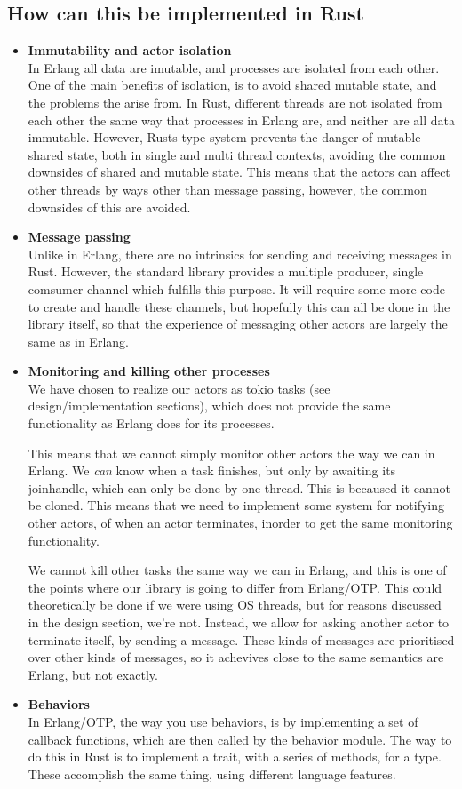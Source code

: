 \documentclass[a4paper]{article}
\begin{document}
\subsection{How can this be implemented in Rust}
\begin{itemize}
\item \textbf{Immutability and actor isolation}\\
  In Erlang all data are imutable, and processes are isolated from each other.
  One of the main benefits of isolation, is to avoid shared mutable state, and
  the problems the arise from. In Rust, different threads are not isolated from
  each other the same way that processes in Erlang are, and neither are all data
  immutable. However, Rusts type system prevents the danger of mutable shared
  state, both in single and multi thread contexts, avoiding the common downsides
  of shared and mutable state. This means that the actors can affect other
  threads by ways other than message passing, however, the common downsides of
  this are avoided.
\item \textbf{Message passing}\\
  Unlike in Erlang, there are no intrinsics for sending and receiving messages
  in Rust. However, the standard library provides a multiple producer, single
  comsumer channel which fulfills this purpose. It will require some more code
  to create and handle these channels, but hopefully this can all be done in the
  library itself, so that the experience of messaging other actors are largely
  the same as in Erlang.
\item \textbf{Monitoring and killing other processes}\\
  We have chosen to realize our actors as tokio tasks (see design/implementation
  sections), which does not provide the same functionality as Erlang does for
  its processes.

  This means that we cannot simply monitor other actors the way we can in
  Erlang. We \textit{can} know when a task finishes, but only by awaiting its
  joinhandle, which can only be done by one thread. This is becaused it cannot
  be cloned. This means that we need to implement some system for notifying
  other actors, of when an actor terminates, inorder to get the same monitoring
  functionality.

  We cannot kill other tasks the same way we can in Erlang, and this is one of
  the points where our library is going to differ from Erlang/OTP. This could
  theoretically be done if we were using OS threads, but for reasons discussed
  in the design section, we're not. Instead, we allow for asking another actor
  to terminate itself, by sending a message. These kinds of messages are
  prioritised over other kinds of messages, so it achevives close to the same
  semantics are Erlang, but not exactly.
\item \textbf{Behaviors}\\
  In Erlang/OTP, the way you use behaviors, is by implementing a set of callback
  functions, which are then called by the behavior module. The way to do this in
  Rust is to implement a trait, with a series of methods, for a type. These
  accomplish the same thing, using different language features.
\end{itemize}
\end{document}
